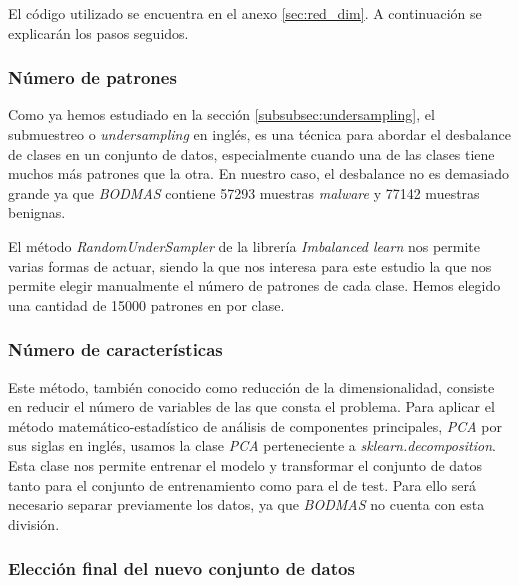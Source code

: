 \vspace{1em}

El código utilizado se encuentra en el anexo \ref{sec:red_dim}. A continuación se explicarán los pasos seguidos.

\subsubsection{Número de patrones}
\label{subsubsec:num_patrones}

Como ya hemos estudiado en la sección \ref{subsubsec:undersampling}, el submuestreo o \textit{undersampling} en inglés, es una técnica para abordar el desbalance de clases en un conjunto de datos, especialmente cuando una de las clases tiene muchos más patrones que la otra. En nuestro caso, el desbalance no es demasiado grande ya que \textit{BODMAS} contiene 57293 muestras \textit{malware} y 77142 muestras benignas.

\vspace{1em}

El método \textit{RandomUnderSampler} \cite{randundersampler} de la librería \textit{Imbalanced learn} nos permite varias formas de actuar, siendo la que nos interesa para este estudio la que nos permite elegir manualmente el número de patrones de cada clase. Hemos elegido una cantidad de 15000 patrones en por clase.

\subsubsection{Número de características}
\label{subsubsec:num_caract}

Este método, también conocido como reducción de la dimensionalidad, consiste en reducir el número de variables de las que consta el problema. Para aplicar el método matemático-estadístico de análisis de componentes principales, \textit{PCA} por sus siglas en inglés, usamos la clase \textit{PCA} \cite{sklearn_pca} perteneciente a \textit{sklearn.decomposition}. Esta clase nos permite entrenar el modelo y transformar el conjunto de datos tanto para el conjunto de entrenamiento como para el de test. Para ello será necesario separar previamente los datos, ya que \textit{BODMAS} no cuenta con esta división.

\subsubsection{Elección final del nuevo conjunto de datos}
\label{subsubsec:eleccion_dataset}


